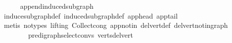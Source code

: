 \begin{isabellebody}
\ \ \ \ \isamarkupfalse%
\ append{\isacharunderscore}{\kern0pt}induced{\isacharunderscore}{\kern0pt}subgraph{}\ \isanewline
\ \ \ \ \isamarkupfalse%
\ induce{\isacharunderscore}{\kern0pt}subgraph{\isacharunderscore}{\kern0pt}def\ induced{\isacharunderscore}{\kern0pt}subgraph{\isacharunderscore}{\kern0pt}def\ app{}{\isacharunderscore}{\kern0pt}head\ app{}{\isacharunderscore}{\kern0pt}tail\isanewline
\ \ \ \ \isamarkupfalse%
\ {\isacharparenleft}{\kern0pt}metis\ {\isacharparenleft}{\kern0pt}no{\isacharunderscore}{\kern0pt}types{\isacharcomma}{\kern0pt}\ lifting{\isacharparenright}{\kern0pt}\ Collect{\isacharunderscore}{\kern0pt}cong\ app{\isacharunderscore}{\kern0pt}notin\ del{\isacharunderscore}{\kern0pt}vert{\isacharunderscore}{\kern0pt}def\ del{\isacharunderscore}{\kern0pt}vert{\isacharunderscore}{\kern0pt}not{\isacharunderscore}{\kern0pt}in{\isacharunderscore}{\kern0pt}graph\ \isanewline
\ \ \ \ \ \ \ \ pre{\isacharunderscore}{\kern0pt}digraph{\isachardot}{\kern0pt}select{\isacharunderscore}{\kern0pt}convs{\isacharparenleft}{\kern0pt}{}{\isacharparenright}{\kern0pt}\ verts{\isacharunderscore}{\kern0pt}del{\isacharunderscore}{\kern0pt}vert{\isacharparenright}{\kern0pt}\isanewline
\isanewline
{}\isamarkupfalse%
%
\endisatagproof
{\isafoldproof}%
%
\isadelimproof
\isanewline
%
\endisadelimproof
\isanewline
{}\isamarkupfalse%
\isanewline
\isanewline
%
\isadelimtheory
\isanewline
%
\endisadelimtheory
%
\isatagtheory
{}\isamarkupfalse%
%
\endisatagtheory
{\isafoldtheory}%
%
\isadelimtheory
%
\endisadelimtheory
%
\end{isabellebody}%
\endinput
